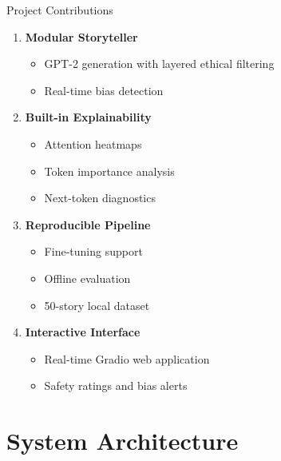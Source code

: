 \documentclass[aspectratio=169]{beamer}
\begin{document}
\begin{frame}{Project Contributions}
    \begin{enumerate}
        \item \textbf{Modular Storyteller}
        \begin{itemize}
            \item GPT-2 generation with layered ethical filtering
            \item Real-time bias detection
        \end{itemize}
        
        \vspace{0.3cm}
        
        \item \textbf{Built-in Explainability}
        \begin{itemize}
            \item Attention heatmaps
            \item Token importance analysis
            \item Next-token diagnostics
        \end{itemize}
        
        \vspace{0.3cm}
        
        \item \textbf{Reproducible Pipeline}
        \begin{itemize}
            \item Fine-tuning support
            \item Offline evaluation
            \item 50-story local dataset
        \end{itemize}
        
        \vspace{0.3cm}
        
        \item \textbf{Interactive Interface}
        \begin{itemize}
            \item Real-time Gradio web application
            \item Safety ratings and bias alerts
        \end{itemize}
    \end{enumerate}
\end{frame}

\section{System Architecture}
\end{document}
